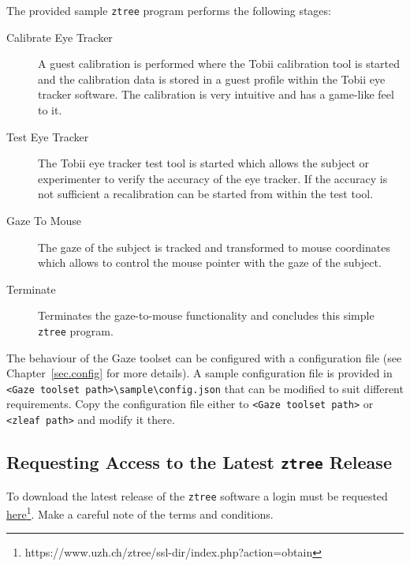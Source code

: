 \documentclass[a4paper,oneside]{book}
\begin{document}
The provided sample \texttt{ztree} program performs the following stages:
\begin{description}
    \item[Calibrate Eye Tracker]
        A guest calibration is performed where the Tobii calibration tool is started and the calibration data is stored in a guest profile within the Tobii eye tracker software.
        The calibration is very intuitive and has a game-like feel to it.
    \item[Test Eye Tracker]
        The Tobii eye tracker test tool is started which allows the subject or experimenter to verify the accuracy of the eye tracker.
        If the accuracy is not sufficient a recalibration can be started from within the test tool.
    \item[Gaze To Mouse]
        The gaze of the subject is tracked and transformed to mouse coordinates which allows to control the mouse pointer with the gaze of the subject.
    \item[Terminate]
        Terminates the gaze-to-mouse functionality and concludes this simple \texttt{ztree} program.
\end{description}

The behaviour of the Gaze toolset can be configured with a configuration file (see Chapter~\ref{sec.config} for more details).
A sample configuration file is provided in \texttt{<Gaze toolset path>\textbackslash sample\textbackslash config.json} that can be modified to suit different requirements.
Copy the configuration file either to \texttt{<Gaze toolset path>} or \texttt{<zleaf path>} and modify it there.

\subsection{Requesting Access to the Latest \texttt{ztree} Release}
\label{sec.ztree}
To download the latest release of the \texttt{ztree} software a login must be requested \href{https://www.uzh.ch/ztree/ssl-dir/index.php?action=obtain}{here}\footnote{https://www.uzh.ch/ztree/ssl-dir/index.php?action=obtain}.
Make a careful note of the terms and conditions.

\end{document}
